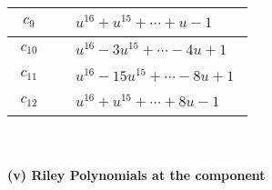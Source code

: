 \documentclass[1p]{elsarticle_modified}
\theoremstyle{definition}
\begin{document}
\begin{tabular}{m{50pt}|m{274pt}}
\hline $$\begin{aligned}c_{9}\end{aligned}$$&$\begin{aligned}
&u^{16}+u^{15}+\cdots+u-1
\end{aligned}$\\
\hline $$\begin{aligned}c_{10}\end{aligned}$$&$\begin{aligned}
&u^{16}-3 u^{15}+\cdots-4 u+1
\end{aligned}$\\
\hline $$\begin{aligned}c_{11}\end{aligned}$$&$\begin{aligned}
&u^{16}-15 u^{15}+\cdots-8 u+1
\end{aligned}$\\
\hline $$\begin{aligned}c_{12}\end{aligned}$$&$\begin{aligned}
&u^{16}+u^{15}+\cdots+8 u-1
\end{aligned}$\\
\hline
\end{tabular}\\~\\
\newpage\renewcommand{\arraystretch}{1}
\flushleft \textbf{(v) Riley Polynomials at the component}\newline \\
\end{document}
